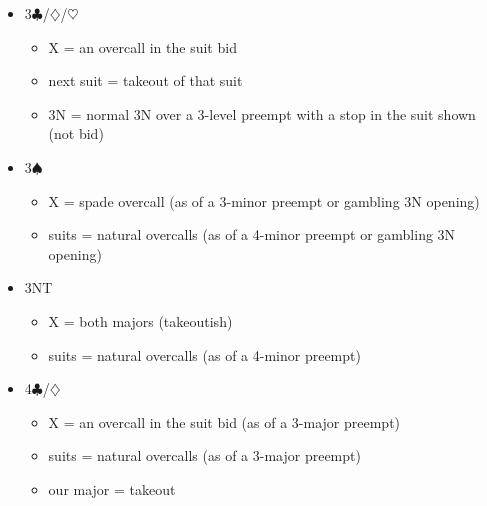 \begin{itemize}
\item 3$\clubsuit$/$\diamondsuit$/$\heartsuit$
	\begin{itemize}
	\item X = an overcall in the suit bid
	\item next suit = takeout of that suit
	\item 3N = normal 3N over a 3-level preempt with a stop in the suit shown (not bid)
	\end{itemize}
\item 3$\spadesuit$
	\begin{itemize}
	\item X = spade overcall (as of a 3-minor preempt or gambling 3N opening)
	\item suits = natural overcalls (as of a 4-minor preempt or gambling 3N opening)
	\end{itemize}
\item 3NT
	\begin{itemize}
	\item X = both majors (takeoutish)
	\item suits = natural overcalls (as of a 4-minor preempt)
	\end{itemize}
\item 4$\clubsuit$/$\diamondsuit$
	\begin{itemize}
	\item X = an overcall in the suit bid (as of a 3-major preempt)
	\item suits = natural overcalls (as of a 3-major preempt)
	\item our major = takeout
	\end{itemize}
\end{itemize}


